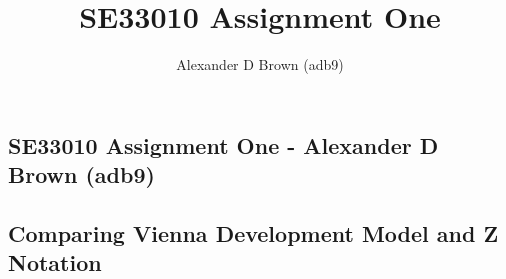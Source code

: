 \documentclass[a4paper, 10pt, notitlepage]{article}
\title{SE33010 Assignment One}
\author{Alexander D Brown (adb9)}
\begin{document}
\begin{centering}
\section*{SE33010 Assignment One - Alexander D Brown (adb9)}
\subsection*{Comparing Vienna Development Model and Z Notation}
\end{centering}
\end{document}
